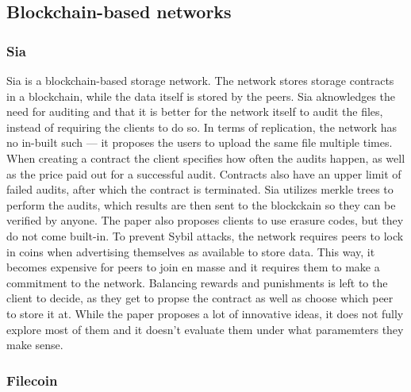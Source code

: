 \subsection{Blockchain-based networks}

\subsubsection{Sia}
Sia \cite{sia} is a blockchain-based storage network.
The network stores storage contracts in a blockchain, while the data itself is stored by the peers.
Sia aknowledges the need for auditing and that it is better for the network itself to audit the files, instead of requiring the clients to do so.
In terms of replication, the network has no in-built such --- it proposes the users to upload the same file multiple times.
When creating a contract the client specifies how often the audits happen, as well as the price paid out for a successful audit.
Contracts also have an upper limit of failed audits, after which the contract is terminated.
Sia utilizes merkle trees to perform the audits, which results are then sent to the blockckain so they can be verified by anyone.
The paper also proposes clients to use erasure codes, but they do not come built-in.
To prevent Sybil attacks, the network requires peers to lock in coins when advertising themselves as available to store data.
This way, it becomes expensive for peers to join en masse and it requires them to make a commitment to the network.
Balancing rewards and punishments is left to the client to decide, as they get to propse the contract as well as choose which peer to store it at.
While the paper proposes a lot of innovative ideas, it does not fully explore most of them and it doesn't evaluate them under what paramemters they make sense.

\subsubsection{Filecoin}


